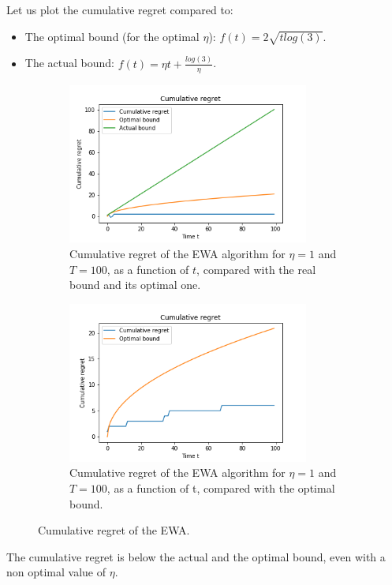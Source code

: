 \begin{enumerate}[resume]
\begin{enumerate}[label=(\alph*)]
	    \begin{solution}
Let us plot the cumulative regret compared to: 
\begin{itemize}
    \item The optimal bound (for the optimal $\eta$): $f(t)=2\sqrt{tlog(3)}$.
    \item The actual bound: $f(t) = \eta t + \frac{log(3)}{\eta}$.
\end{itemize}
\begin{figure}[h!]
\centering
\begin{subfigure}{.47\textwidth}
  \centering
  \includegraphics[height=150pt]{image1/q3d_regrets.png}
  \caption{Cumulative regret of the EWA algorithm for $\eta = 1$ and $T = 100$, as a function of $t$, compared with the real bound and its optimal one.}
  \label{fig:sub1}
\end{subfigure}%
\hspace{2mm}
\begin{subfigure}{.47\textwidth}
  \centering
  \includegraphics[height=150pt]{image1/q3d_regrets_bis.png}
  \caption{Cumulative regret of the EWA algorithm for $\eta = 1$ and $T=100$, as a function of t, compared with the optimal bound.}
  \label{fig:sub2}
\end{subfigure}%
\caption{Cumulative regret of the EWA.}
\label{fig:cum-regrets}
\end{figure}
The cumulative regret is below the actual and the optimal bound, even with a non optimal value of $\eta$.
        \end{solution}
 		

\end{enumerate}
\end{enumerate}
